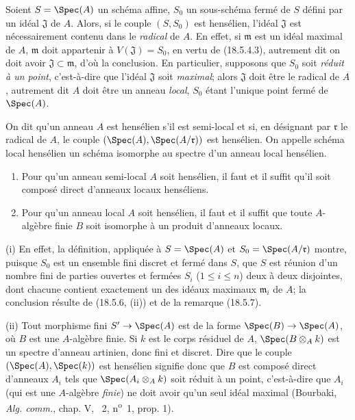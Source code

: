 \begin{remark}[18.5.7]
\label{IV.18.5.7}
Soient $S=\Spec(A)$ un schéma affine, $S_0$ un sous-schéma fermé de $S$ défini par un idéal $\mathfrak J$ de $A$. Alors, si le couple $(S,S_0)$ est hensélien, l'idéal $\mathfrak J$ est nécessairement contenu dans le \emph{radical} de $A$. En effet, si $\mathfrak m$ est un idéal maximal de $A$, $\mathfrak m$ doit appartenir à $V(\mathfrak J)=S_0$, en vertu de (18.5.4.3), autrement dit on doit avoir $\mathfrak J\subset\mathfrak m$, d'où la conclusion. En particulier, supposons que $S_0$ soit \emph{réduit à un point}, c'est-à-dire que l'idéal $\mathfrak J$ soit \emph{maximal}; alors $\mathfrak J$ doit être le radical de $A$, autrement dit $A$ doit être un anneau \emph{local}, $S_0$ étant l'unique point fermé de $\Spec(A)$.
\end{remark}

\begin{definition}[18.5.8]
On dit qu'un anneau $A$ est hensélien s'il est semi-local et si, en désignant par $\mathfrak r$ le radical de $A$, le couple $(\Spec(A),\Spec(A/\mathfrak r))$ est hensélien. On appelle schéma local hensélien un schéma isomorphe au spectre d'un anneau local hensélien.
\end{definition}

\begin{proposition}[18.5.9]
\label{IV.18.5.9}
\begin{enumerate}
  \item[\textup{(i)}] Pour qu'un anneau semi-local $A$ soit hensélien, il faut et il suffit qu'il soit composé direct d'anneaux locaux henséliens.
  \item[\textup{(ii)}] Pour qu'un anneau local $A$ soit hensélien, il faut et il suffit que toute $A$-algèbre finie $B$ soit isomorphe à un produit d'anneaux \textup{locaux}.
\end{enumerate}
\end{proposition}

(i) En effet, la définition, appliquée à $S=\Spec(A)$ et $S_0=\Spec(A/\mathfrak r)$ montre, puisque $S_0$ est un ensemble fini discret et fermé dans $S$, que $S$ est réunion d'un nombre fini de parties ouvertes et fermées $S_i$ ($1\leq i\leq n$) deux à deux disjointes, dont chacune contient exactement un des idéaux maximaux $\mathfrak m_i$ de $A$; la conclusion résulte de (18.5.6, (ii)) et de la remarque (18.5.7).

(ii) Tout morphisme fini $S'\to\Spec(A)$ est de la forme $\Spec(B)\to\Spec(A)$, où $B$ est une $A$-algèbre finie. Si $k$ est le corps résiduel de $A$, $\Spec(B\otimes_A k)$ est un spectre d'anneau artinien, donc fini et discret. Dire que le couple $(\Spec(A),\Spec(k))$ est hensélien signifie donc que $B$ est composé direct d'anneaux $A_i$ tels que $\Spec(A_i\otimes_A k)$ soit réduit à un point, c'est-à-dire que $A_i$ (qui est une $A$-algèbre \emph{finie}) ne doit avoir qu'un seul idéal maximal (Bourbaki, \emph{Alg. comm.}, chap. V, \textsection~2, n\textsuperscript{o}~1, prop. 1).

